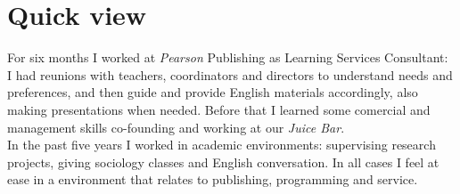 \documentclass[a4paper,hidelinks]{twentysecondcv} %
\begin{document}
% 


\section{Quick view}

For six months I worked at \textit{Pearson} Publishing as Learning Services Consultant: I had reunions with teachers, coordinators and directors to understand needs and preferences, and then guide and provide English materials accordingly, also making presentations when needed. 
Before that I learned some comercial and management skills co-founding and working at our \textit{Juice Bar}.
\\
In the past five years I worked in academic environments: supervising research projects, giving sociology classes and English conversation. In all cases I feel at ease in a environment that relates to publishing, programming and service.
\end{document}
